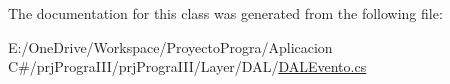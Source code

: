 The documentation for this class was generated from the following file\+:\begin{DoxyCompactItemize}
\item 
E\+:/\+One\+Drive/\+Workspace/\+Proyecto\+Progra/\+Aplicacion C\#/prj\+Progra\+I\+I\+I/prj\+Progra\+I\+I\+I/\+Layer/\+D\+A\+L/\hyperlink{_d_a_l_evento_8cs}{D\+A\+L\+Evento.\+cs}\end{DoxyCompactItemize}
